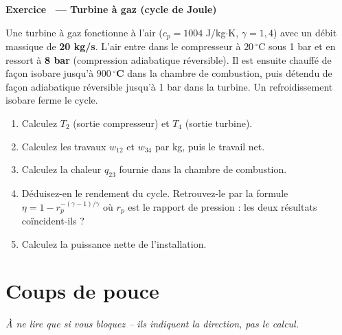 \documentclass[11pt,a4paper]{article}
\newcounter{exo}
\newcommand{\exo}[1]{\refstepcounter{exo}\par\medskip\noindent
{\color{cbleu}\bfseries\large Exercice \theexo\ --- #1}\par\smallskip}
\begin{document}
\exo{Turbine à gaz (cycle de Joule)}
\begin{ex}
Une turbine à gaz fonctionne à l'air ($c_p=1004$ J/kg$\cdot$K, $\gamma=1{,}4$) avec un débit massique de
\textbf{20 kg/s}. L'air entre dans le compresseur à $20\,^\circ$C sous 1 bar et en ressort à
\textbf{8 bar} (compression adiabatique réversible). Il est ensuite chauffé de façon isobare jusqu'à
\textbf{$900\,^\circ$C} dans la chambre de combustion, puis détendu de façon adiabatique réversible
jusqu'à 1 bar dans la turbine. Un refroidissement isobare ferme le cycle.

\begin{enumerate}[label=\alph*),leftmargin=1.6em,nosep]
\item Calculez $T_2$ (sortie compresseur) et $T_4$ (sortie turbine).
\item Calculez les travaux $w_{12}$ et $w_{34}$ par kg, puis le travail net.
\item Calculez la chaleur $q_{23}$ fournie dans la chambre de combustion.
\item Déduisez-en le rendement du cycle. Retrouvez-le par la formule $\eta=1-r_p^{-(\gamma-1)/\gamma}$
où $r_p$ est le rapport de pression : les deux résultats coïncident-ils ?
\item Calculez la puissance nette de l'installation.
\end{enumerate}
\end{ex}

\newpage
\section{Coups de pouce}
\emph{À ne lire que si vous bloquez -- ils indiquent la direction, pas le calcul.}
\end{document}
